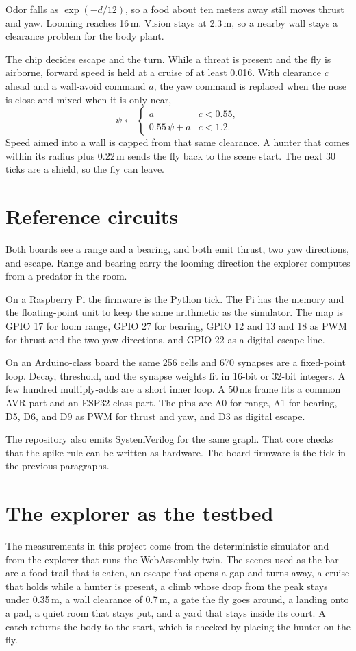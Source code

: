 \documentclass[conference]{IEEEtran}
\begin{document}
Odor falls as \(\exp(-d / 12)\), so a food about ten meters away still moves thrust and yaw.
Looming reaches 16\,m.
Vision stays at 2.3\,m, so a nearby wall stays a clearance problem for the body plant.

The chip decides escape and the turn.
While a threat is present and the fly is airborne, forward speed is held at a cruise of at least 0.016.
With clearance \(c\) ahead and a wall-avoid command \(a\), the yaw command is replaced when the nose is close and mixed when it is only near,
\begin{equation}
\psi \leftarrow
\begin{cases}
a & c < 0.55,\\
0.55\,\psi + a & c < 1.2.
\end{cases}
\label{eq:wall}
\end{equation}
Speed aimed into a wall is capped from that same clearance.
A hunter that comes within its radius plus 0.22\,m sends the fly back to the scene start.
The next 30 ticks are a shield, so the fly can leave.

\section{Reference circuits}
Both boards see a range and a bearing, and both emit thrust, two yaw directions, and escape.
Range and bearing carry the looming direction the explorer computes from a predator in the room.

On a Raspberry Pi the firmware is the Python tick.
The Pi has the memory and the floating-point unit to keep the same arithmetic as the simulator.
The map is GPIO 17 for loom range, GPIO 27 for bearing, GPIO 12 and 13 and 18 as PWM for thrust and the two yaw directions, and GPIO 22 as a digital escape line.

On an Arduino-class board the same 256 cells and 670 synapses are a fixed-point loop.
Decay, threshold, and the synapse weights fit in 16-bit or 32-bit integers.
A few hundred multiply-adds are a short inner loop.
A 50\,ms frame fits a common AVR part and an ESP32-class part.
The pins are A0 for range, A1 for bearing, D5, D6, and D9 as PWM for thrust and yaw, and D3 as digital escape.

The repository also emits SystemVerilog for the same graph.
That core checks that the spike rule can be written as hardware.
The board firmware is the tick in the previous paragraphs.

\section{The explorer as the testbed}
The measurements in this project come from the deterministic simulator and from the explorer that runs the WebAssembly twin.
The scenes used as the bar are a food trail that is eaten, an escape that opens a gap and turns away, a cruise that holds while a hunter is present, a climb whose drop from the peak stays under 0.35\,m, a wall clearance of 0.7\,m, a gate the fly goes around, a landing onto a pad, a quiet room that stays put, and a yard that stays inside its court.
A catch returns the body to the start, which is checked by placing the hunter on the fly.
\end{document}
